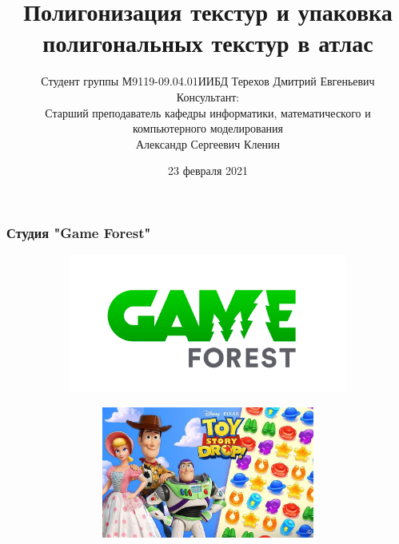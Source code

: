 \documentclass[10pt, unicode]{beamer}
\title{Полигонизация текстур и упаковка полигональных текстур в атлас}
\author[Терехов Д.Е.]{Студент группы М9119-09.04.01ИИБД Терехов Дмитрий Евгеньевич\\
Консультант:\\
Старший преподаватель кафедры информатики, математического и компьютерного моделирования\\
Александр Сергеевич Кленин}
\date{23 февраля 2021}
\begin{document}
    \begin{frame}[fragile]
        \titlepage
        \thispagestyle{empty}
    \end{frame}
    \begin{frame}
        \frametitle{Студия "Game Forest"}
        \begin{figure}[H]
            \centering
            \begin{subfigure}[l]{0.50\linewidth}
                \centering
                \includegraphics[scale=0.15]{GAMEFOREST.png}
            \end{subfigure}
            \begin{subfigure}{0.49\linewidth}
                \begin{subfigure}{\linewidth}
                    \centering
                    \includegraphics[scale=0.15]{TSD.jpg}
                \end{subfigure}
                \begin{subfigure}{\linewidth}
                    \centering

\end{subfigure}
\end{subfigure}
\end{figure}
\end{frame}
\end{document}
